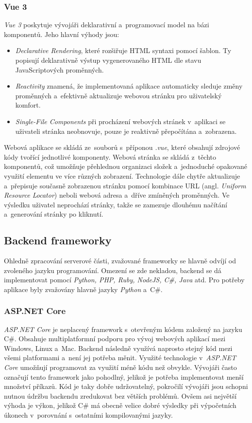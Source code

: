 \subsubsection{Vue 3}
\emph{Vue 3} poskytuje vývojáři deklarativní a~programovací model na bázi komponentů. Jeho hlavní výhody jsou:
\begin{itemize}
    \item \emph{Declarative Rendering}, které rozšiřuje HTML syntaxi pomocí šablon. Ty popisují deklarativně výstup vygenerovaného HTML dle stavu JavaScriptových proměnných. 
    \item \emph{Reactivity} znamená, že implementovaná aplikace automaticky sleduje změny proměnných a~efektivně aktualizuje webovou stránku pro uživatelský komfort.
    \item \emph{Single-File Components} při procházení webových stránek v~aplikaci se uživateli stránka neobnovuje, pouze je reaktivně přepočítána a~zobrazena.
\end{itemize}
Webová aplikace se skládá ze~souborů s~příponou \emph{.vue}, které obsahují zdrojové kódy tvořící jednotlivé komponenty. Webová stránka se skládá z~těchto komponentů, což umožňuje přehlednou organizaci složek a~jednoduché opakované využití elementu ve více různých zobrazení. Technologie dále chytře aktualizuje a~přepisuje současně zobrazenou stránku pomocí kombinace URL (angl. \emph{Uniform Resource Locator}) neboli webová adresa a~dříve zmíněných proměnných. Ve výsledku uživatel neprochází stránky, takže se zamezuje dlouhému načítání a~generování stránky po kliknutí.~\cite{vuejs}

\subsection{Backend frameworky}
Ohledně zpracování serverové části, zvažované frameworky se hlavně odvíjí od zvoleného jazyku programování. Omezení se zde nekladou, backend se dá implementovat pomocí \emph{Python, PHP, Ruby, NodeJS, C\#, Java} atd. 
Pro potřeby aplikace byly zvažovány hlavně jazyky \emph{Python} a~C\#.
\subsubsection{ASP.NET Core}
\emph{ASP.NET Core} je neplacený framework s~otevřeným kódem založený na jazyku C\#. Obsahuje multiplatformní podporu pro vývoj webových aplikací mezi Windows, Linux a~Mac. Backend následně využívá naprosto stejný kód mezi všemi platformami a~není jej potřeba měnit. Využité technologie v~\emph{ASP.NET Core} umožňují programovat za využití méně kódu než obvykle. Vývojáři často označují tento framework jako pohodlný, jelikož je potřeba implementovat menší množství příkazů. Kód je taky dobře udržovatelný, pokročilí vývojáři jsou schopni nutnou údržbu backendu zredukovat bez větších problémů. Ovšem asi největší výhoda je výkon, jelikož C\# má obecně velice dobré výsledky při výpočetních úkonech v~porovnání s~ostatními kompilovanými jazyky.~\cite{bestbackend}   


